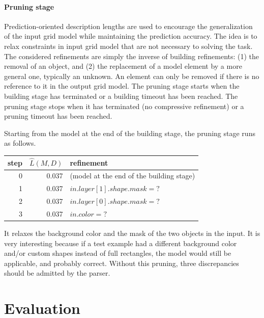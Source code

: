 \documentclass[a4paper]{llncs}
\begin{document}
\paragraph{Pruning stage}
Prediction-oriented description lengths are used to encourage the
generalization of the input grid model while maintaining the
prediction accuracy. The idea is to relax constraints in input grid
model that are not necessary to solving the task. The considered
refinements are simply the inverse of building refinements: (1) the
removal of an object, and (2) the replacement of a model element by a
more general one, typically an unknown. An element can only be removed
if there is no reference to it in the output grid model. The pruning
stage starts when the building stage has terminated or a building
timeout has been reached. The pruning stage stops when it has
terminated (no compressive refinement) or a pruning timeout has been
reached.

Starting from the model at the end of the building stage, the pruning
stage runs as follows.

\begin{center}
  \begin{tabular}{|r|r|l|}
    \hline
    step & $\hat{L}(M,D)$ & refinement \\
    \hline
    0 & 0.037 & (model at the end of the building stage) \\
    1 & 0.037 & $in.layer[1].shape.mask = ?$ \\
    2 & 0.037 & $in.layer[0].shape.mask = ?$ \\
    3 & 0.037 & $in.color = ?$ \\
    \hline
  \end{tabular}
\end{center}

It relaxes the background color and the mask of the two objects in the
input. It is very interesting because if a test example had a
different background color and/or custom shapes instead of full
rectangles, the model would still be applicable, and probably
correct. Without this pruning, three discrepancies should be admitted
by the parser.


\section{Evaluation}
\label{eval}
\end{document}
